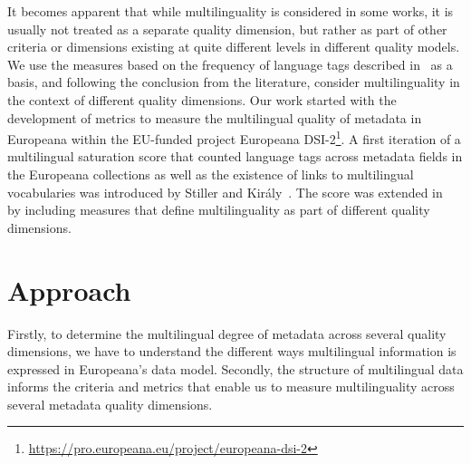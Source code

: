 It becomes apparent that while multilinguality is considered in some works, it is usually not treated as a separate quality dimension, but rather as part of other criteria or dimensions existing at quite different levels in different quality models. %
We use the measures based on the frequency of language tags described in~\cite{vogias2013} as a basis, and following the conclusion from the literature, consider multilinguality in the context of different quality dimensions. Our work started with the development of metrics to measure the multilingual quality of metadata in Europeana within the EU-funded project Europeana DSI-2\footnote{\url{https://pro.europeana.eu/project/europeana-dsi-2}}. 
A first iteration of a multilingual saturation score that counted language tags across metadata fields in the Europeana collections as well as the existence of links to multilingual vocabularies was introduced by Stiller and Király~\cite{stiller-kiraly2017}. The score was extended in~\cite{charles2017} by including measures that define multilinguality as part of different quality dimensions. 
\section{Approach}
Firstly, to determine the multilingual degree of metadata across several quality dimensions, we have to understand the different ways multilingual information is expressed in Europeana's data model. Secondly, the structure of multilingual data informs the criteria and metrics that enable us to measure multilinguality across several metadata quality dimensions.
